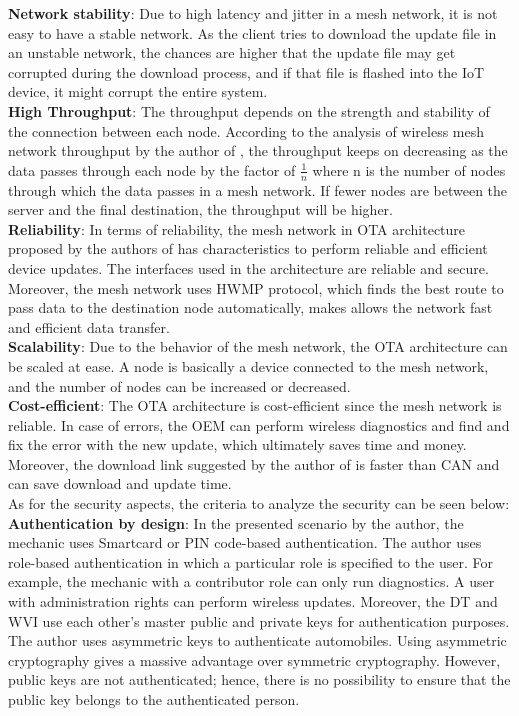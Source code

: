 \documentclass[12pt,a4paper]{article}
\begin{document}
{\textbf{Network stability}: Due to high latency and jitter in a mesh network, it is not easy to have a stable network. As the client tries to download the update file in an unstable network, the chances are higher that the update file may get corrupted during the download process, and if that file is flashed into the IoT device, it might corrupt the entire system.  \\

\textbf{High Throughput}: The throughput depends on the strength and stability of the connection between each node. According to the analysis of wireless mesh network throughput by the author of \cite{r32}, the throughput keeps on decreasing as the data passes through each node by the factor of $\frac{1}{n}$ where n is the number of nodes through which the data passes in a mesh network. If fewer nodes are between the server and the final destination, the throughput will be higher. \cite{r3} \cite{r32} \\

\textbf{Reliability}: In terms of reliability, the mesh network in OTA architecture proposed by the authors of \cite{r3} has characteristics to perform reliable and efficient device updates. The interfaces used in the architecture are reliable and secure. Moreover, the mesh network uses HWMP protocol, which finds the best route to pass data to the destination node automatically, makes allows the network fast and efficient data transfer. \cite{r3} \\

\textbf{Scalability}: Due to the behavior of the mesh network, the OTA architecture can be scaled at ease. A node is basically a device connected to the mesh network, and the number of nodes can be increased or decreased. \\

\textbf{Cost-efficient}: The OTA architecture is cost-efficient since the mesh network is reliable. In case of errors, the OEM can perform wireless diagnostics and find and fix the error with the new update, which ultimately saves time and money. Moreover, the download link suggested by the author of \cite{r3} is faster than CAN and can save download and update time. \\

As for the security aspects, the criteria to analyze the security can be seen below: \\

\textbf{Authentication by design}: In the presented scenario by the author, the mechanic uses Smartcard or PIN code-based authentication. The author uses role-based authentication in which a particular role is specified to the user. For example, the mechanic with a contributor role can only run diagnostics. A user with administration rights can perform wireless updates. Moreover, the DT and WVI use each other's master public and private keys for authentication purposes. \cite{r3} The author uses asymmetric keys to authenticate automobiles. Using asymmetric cryptography gives a massive advantage over symmetric cryptography. However, public keys are not authenticated; hence, there is no possibility to ensure that the public key belongs to the authenticated person. \cite{r33} \\

}
\end{document}
